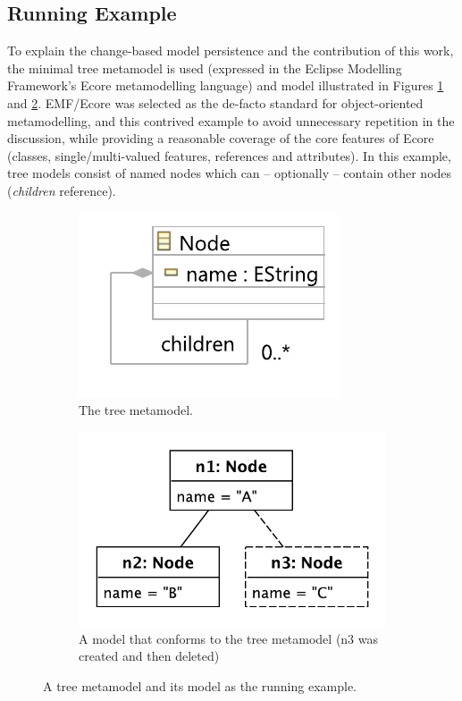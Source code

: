 \documentclass[12pt, a4paper]{report} \usepackage[titletoc]{appendix}
\begin{document}
\subsection{Running Example}
\label{subsec:case_study}
To explain the change-based model persistence and the contribution of this work, the minimal tree metamodel is used (expressed in the Eclipse Modelling Framework's Ecore metamodelling language) and model illustrated in Figures \ref{fig:tree_metamodel} and \ref{fig:initial_model}. EMF/Ecore was selected as the de-facto standard for object-oriented metamodelling, and this contrived example to avoid unnecessary repetition in the discussion, while providing a reasonable coverage of the core features of Ecore (classes, single/multi-valued features, references and attributes). In this example, tree models consist of named nodes which can -- optionally -- contain other nodes (\emph{children} reference).

\begin{figure}[ht]
	\begin{subfigure}[t]{0.4\linewidth}
		\centering
		\includegraphics[width=0.8\linewidth]{node_metamodel}
		\caption{The tree metamodel.}
		\label{fig:tree_metamodel}
	\end{subfigure}
	\hfill
	\begin{subfigure}[t]{0.6\linewidth}
		\centering
		\includegraphics[width=0.6\linewidth]{initial_chart}
		\caption{A model that conforms to the tree metamodel (n3 was created and then deleted)}
		\label{fig:initial_model}
	\end{subfigure}
	\caption{A tree metamodel and its model as the running example.}
	\label{fig:append_speed}
\end{figure}
\end{document}

